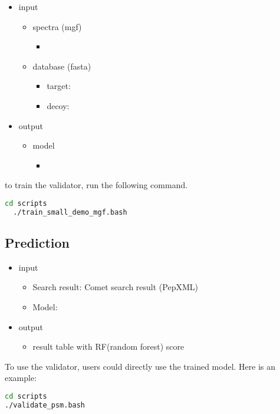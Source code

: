 \documentclass{ctexart}
\begin{document}
\begin{itemize}
  \item input
  \begin{itemize}
    \item spectra (mgf)
    \begin{itemize}
      \item {}
    \end{itemize} 
    \item database (fasta)
    \begin{itemize}
      \item target: 
      \item decoy:  
    \end{itemize} 
  \end{itemize}

  \item output
  \begin{itemize}
    \item model
    \begin{itemize}
      \item {}
    \end{itemize}
  \end{itemize}
\end{itemize}

to train the validator, run the following command. 
\begin{lstlisting}[language=bash]
  cd scripts
  ./train_small_demo_mgf.bash
\end{lstlisting}

\subsection{Prediction}

\begin{itemize}
  \item input 
  \begin{itemize}
    \item Search result: Comet search result (PepXML)
    \item Model: 
  \end{itemize} 

  \item output
  \begin{itemize}
    \item result table with RF(random forest) score

  \end{itemize} 
\end{itemize} 

To use the validator, users could directly use the trained model. Here is an example:

\begin{lstlisting}[language=bash]
cd scripts
./validate_psm.bash
\end{lstlisting}
\end{document}
